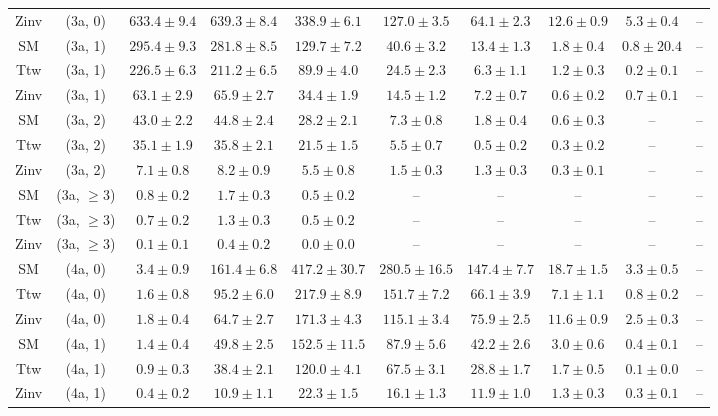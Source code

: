 \begin{table}[h!]
{\begin{tabular}{cccccccccc}
	Zinv & (3a, 0) & $633.4\pm 9.4$ & $639.3\pm 8.4$ & $338.9\pm 6.1$ & $127.0\pm 3.5$ & $64.1\pm 2.3$ & $12.6\pm 0.9$ & $5.3\pm 0.4$ & -- \\[0.5ex] 
	SM & (3a, 1) & $295.4\pm 9.3$ & $281.8\pm 8.5$ & $129.7\pm 7.2$ & $40.6\pm 3.2$ & $13.4\pm 1.3$ & $1.8\pm 0.4$ & $0.8\pm 20.4$ & -- \\[0.5ex] 
	Ttw & (3a, 1) & $226.5\pm 6.3$ & $211.2\pm 6.5$ & $89.9\pm 4.0$ & $24.5\pm 2.3$ & $6.3\pm 1.1$ & $1.2\pm 0.3$ & $0.2\pm 0.1$ & -- \\[0.5ex] 
	Zinv & (3a, 1) & $63.1\pm 2.9$ & $65.9\pm 2.7$ & $34.4\pm 1.9$ & $14.5\pm 1.2$ & $7.2\pm 0.7$ & $0.6\pm 0.2$ & $0.7\pm 0.1$ & -- \\[0.5ex] 
	SM & (3a, 2) & $43.0\pm 2.2$ & $44.8\pm 2.4$ & $28.2\pm 2.1$ & $7.3\pm 0.8$ & $1.8\pm 0.4$ & $0.6\pm 0.3$ & -- & -- \\[0.5ex] 
	Ttw & (3a, 2) & $35.1\pm 1.9$ & $35.8\pm 2.1$ & $21.5\pm 1.5$ & $5.5\pm 0.7$ & $0.5\pm 0.2$ & $0.3\pm 0.2$ & -- & -- \\[0.5ex] 
	Zinv & (3a, 2) & $7.1\pm 0.8$ & $8.2\pm 0.9$ & $5.5\pm 0.8$ & $1.5\pm 0.3$ & $1.3\pm 0.3$ & $0.3\pm 0.1$ & -- & -- \\[0.5ex] 
	SM & (3a, $\ge3$) & $0.8\pm 0.2$ & $1.7\pm 0.3$ & $0.5\pm 0.2$ & -- & -- & -- & -- & -- \\[0.5ex] 
	Ttw & (3a, $\ge3$) & $0.7\pm 0.2$ & $1.3\pm 0.3$ & $0.5\pm 0.2$ & -- & -- & -- & -- & -- \\[0.5ex] 
	Zinv & (3a, $\ge3$) & $0.1\pm 0.1$ & $0.4\pm 0.2$ & $0.0\pm 0.0$ & -- & -- & -- & -- & -- \\[0.5ex] 
	SM & (4a, 0) & $3.4\pm 0.9$ & $161.4\pm 6.8$ & $417.2\pm 30.7$ & $280.5\pm 16.5$ & $147.4\pm 7.7$ & $18.7\pm 1.5$ & $3.3\pm 0.5$ & -- \\[0.5ex] 
	Ttw & (4a, 0) & $1.6\pm 0.8$ & $95.2\pm 6.0$ & $217.9\pm 8.9$ & $151.7\pm 7.2$ & $66.1\pm 3.9$ & $7.1\pm 1.1$ & $0.8\pm 0.2$ & -- \\[0.5ex] 
	Zinv & (4a, 0) & $1.8\pm 0.4$ & $64.7\pm 2.7$ & $171.3\pm 4.3$ & $115.1\pm 3.4$ & $75.9\pm 2.5$ & $11.6\pm 0.9$ & $2.5\pm 0.3$ & -- \\[0.5ex] 
	SM & (4a, 1) & $1.4\pm 0.4$ & $49.8\pm 2.5$ & $152.5\pm 11.5$ & $87.9\pm 5.6$ & $42.2\pm 2.6$ & $3.0\pm 0.6$ & $0.4\pm 0.1$ & -- \\[0.5ex] 
	Ttw & (4a, 1) & $0.9\pm 0.3$ & $38.4\pm 2.1$ & $120.0\pm 4.1$ & $67.5\pm 3.1$ & $28.8\pm 1.7$ & $1.7\pm 0.5$ & $0.1\pm 0.0$ & -- \\[0.5ex] 
	Zinv & (4a, 1) & $0.4\pm 0.2$ & $10.9\pm 1.1$ & $22.3\pm 1.5$ & $16.1\pm 1.3$ & $11.9\pm 1.0$ & $1.3\pm 0.3$ & $0.3\pm 0.1$ & -- \\[0.5ex] 

\end{tabular}}
\end{table}
